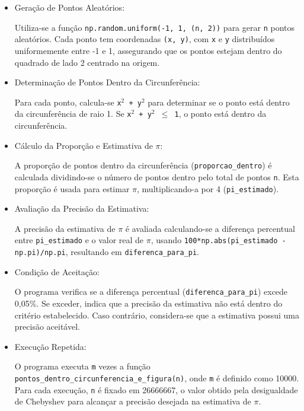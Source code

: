 \documentclass[paper=a4wide, fontsize=10pt]{scrartcl}	 %
\begin{document}
\begin{itemize}

\item {Geração de Pontos Aleatórios:}

Utiliza-se a função \texttt{np.random.uniform(-1, 1, (n, 2))} para gerar \texttt{n} pontos aleatórios. Cada ponto tem coordenadas \texttt{(x, y)}, com \texttt{x} e \texttt{y} distribuídos uniformemente entre -1 e 1, assegurando que os pontos estejam dentro do quadrado de lado 2 centrado na origem.

\item {Determinação de Pontos Dentro da Circunferência:}

Para cada ponto, calcula-se \texttt{x$^2$ + y$^2$} para determinar se o ponto está dentro da circunferência de raio 1. Se \texttt{x$^2$ + y$^2$ $\leq$ 1}, o ponto está dentro da circunferência.

\item {Cálculo da Proporção e Estimativa de $\pi$:}

A proporção de pontos dentro da circunferência (\texttt{proporcao\_dentro}) é calculada dividindo-se o número de pontos dentro pelo total de pontos \texttt{n}. Esta proporção é usada para estimar $\pi$, multiplicando-a por 4 (\texttt{pi\_estimado}).

\item {Avaliação da Precisão da Estimativa:}

A precisão da estimativa de $\pi$ é avaliada calculando-se a diferença percentual entre \texttt{pi\_estimado} e o valor real de $\pi$, usando \texttt{100*np.abs(pi\_estimado - np.pi)/np.pi}, resultando em \texttt{diferenca\_para\_pi}.

\item {Condição de Aceitação:}

O programa verifica se a diferença percentual (\texttt{diferenca\_para\_pi}) excede 0,05\%. Se exceder, indica que a precisão da estimativa não está dentro do critério estabelecido. Caso contrário, considera-se que a estimativa possui uma precisão aceitável.

\item {Execução Repetida:}

O programa executa \texttt{m} vezes a função \texttt{pontos\_dentro\_circunferencia\_e\_figura(n)}, onde \texttt{m} é definido como 10000. Para cada execução, \texttt{n} é fixado em 26666667, o valor obtido pela desigualdade de Chebyshev para alcançar a precisão desejada na estimativa de $\pi$.

\end{itemize}
\end{document}
